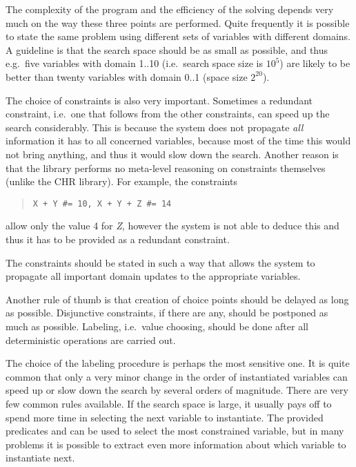 The complexity of the program and the efficiency of the solving
depends very much on the way these three points are performed.
Quite frequently it is possible to state the same problem
using different sets of variables with different domains.
A guideline is that the search space should be as small as possible,
and thus e.g.\ five variables with domain 1..10
(i.e.\ search space size is $10^5$)
are likely to be better than
twenty variables with domain 0..1
(space size $2^{20}$).

The choice of constraints is also very important.
Sometimes a redundant constraint, i.e.\ one that follows from the
other constraints, can speed up the search considerably.
This is because the system does not propagate {\it all}
information it has to all concerned variables, because
most of the time this would not bring anything, and thus it would
slow down the search.
Another reason is that the library performs no meta-level reasoning on
constraints themselves (unlike the {\sf CHR} library).
For example, the constraints
\begin{quote}
\begin{verbatim}
X + Y #= 10, X + Y + Z #= 14
\end{verbatim}
\end{quote}
allow only the value 4 for {\it Z}, however the system is not
able to deduce this and thus it has to be provided
as a redundant constraint.

The constraints should be stated in such a way that allows the system
to propagate all important domain updates to the appropriate variables.

Another rule of thumb is that creation of choice points should be delayed
as long as possible. Disjunctive constraints, if there are any,
should be postponed as much as possible. Labeling, i.e.\ value
choosing, should be done after all deterministic operations
are carried out.

The choice of the labeling procedure is perhaps the most
sensitive one.
It is quite common that only a very minor change in the order
of instantiated variables can speed up or slow down the search
by several orders of magnitude.
There are very few common rules available.
If the search space is large, it usually pays off to spend
more time in selecting the next variable to instantiate.
The provided predicates  and 
can be used to select the most constrained variable, but in
many problems it is possible to extract even more information
about which variable to instantiate next.

